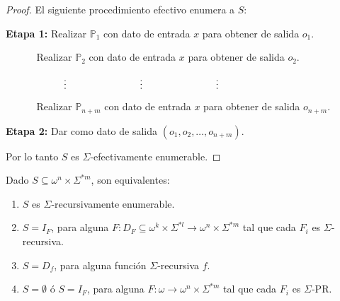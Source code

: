 \begin{proof}
    \PN El siguiente procedimiento efectivo enumera a $S$:

    \vspace{3mm}
    \PN \textbf{Etapa 1:}
    Realizar $\mathbb{P}_{1}$ con dato de entrada $x$ para obtener de salida $o_{1}$.

    $\qquad\;\;\;\;$Realizar $\mathbb{P}_{2}$ con dato de entrada $x$ para obtener de salida $o_{2}$.

    $\qquad\;\;\;\;\vdotswithin{(n-1)m+1} \qquad \vdotswithin{(n-1)m+2} \qquad \vdotswithin{(n-1)m+r}$

    $\qquad\;\;\;\;$Realizar $\mathbb{P}_{n+m}$ con dato de entrada $x$ para obtener de salida $o_{n+m}$.

    \PN \textbf{Etapa 2:}
    Dar como dato de salida $(o_{1}, o_{2}, \dotsc, o_{n+m})$.

    \vspace{3mm}
    \PN Por lo tanto $S$ es $\Sigma$-efectivamente enumerable.
  \end{proof}

  \begin{theorem}
    \PN Dado $S \subseteq \omega^{n} \times \Sigma^{\ast m}$, son equivalentes:
    \begin{enumerate}
      \item $S$ es $\Sigma$-recursivamente enumerable.
      \item $S = I_{F}$, para alguna $F: D_{F} \subseteq \omega^{k} \times \Sigma^{\ast l} \rightarrow \omega^{n} \times
        \Sigma^{\ast m}$ tal que cada $F_{i}$ es $\Sigma$-recursiva.
      \item $S = D_{f}$, para alguna función $\Sigma$-recursiva $f$.
      \item $S = \emptyset $ ó $S = I_{F}$, para alguna $F: \omega \rightarrow \omega^{n} \times \Sigma^{\ast m}$ tal
        que cada $F_{i}$ es $\Sigma$-PR.
    \end{enumerate}
  \end{theorem}

